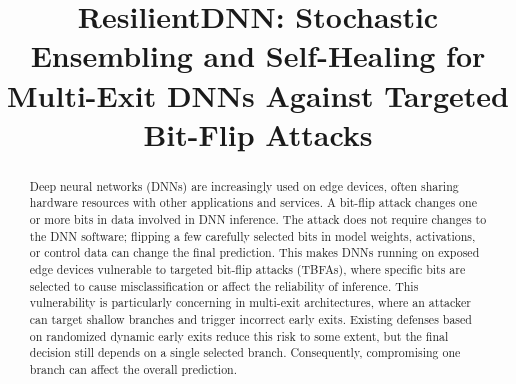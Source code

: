 \documentclass[conference,10pt]{IEEEtran}
\title{ResilientDNN: Stochastic Ensembling and Self-Healing for Multi-Exit DNNs Against Targeted Bit-Flip Attacks}
\begin{document}
\maketitle

\begin{abstract}


Deep neural networks (DNNs) are increasingly used on edge devices, often sharing hardware resources with other applications and services. A bit-flip attack changes one or more bits in data involved in DNN inference. The attack does not require changes to the DNN software; flipping a few carefully selected bits in model weights, activations, or control data can change the final prediction. This makes DNNs running on exposed edge devices vulnerable to targeted bit-flip attacks (TBFAs), where specific bits are selected to cause misclassification or affect the reliability of inference. This vulnerability is particularly concerning in multi-exit architectures, where an attacker can target shallow branches and trigger incorrect early exits. Existing defenses based on randomized dynamic early exits reduce this risk to some extent, but the final decision still depends on a single selected branch. Consequently, compromising one branch can affect the overall prediction.


\end{abstract}
\end{document}
